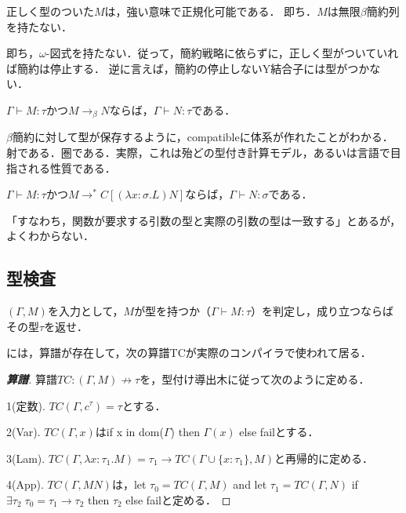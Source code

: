 \documentclass[uplatex, dvipdfmx]{jsreport}
\begin{document}
\begin{theorem}\label{thm-strong-normalizability}
    正しく型のついた$M$は，強い意味で正規化可能である．
    即ち．$M$は無限$\beta$簡約列を持たない．
\end{theorem}
\begin{remark}
    即ち，$\omega$-図式を持たない．従って，簡約戦略に依らずに，正しく型がついていれば簡約は停止する．
    逆に言えば，簡約の停止しないY結合子には型がつかない．
\end{remark}

\begin{theorem}\label{thm-subject-reduction-theorem}
    $\Gamma\vdash M:\tau$かつ$M\to_\beta N$ならば，$\Gamma\vdash N:\tau$である．
\end{theorem}
\begin{remark}
    $\beta$簡約に対して型が保存するように，compatibleに体系が作れたことがわかる．射である．圏である．実際，これは殆どの型付き計算モデル，あるいは言語で目指される性質である．
\end{remark}
\begin{corollary}
    $\Gamma\vdash M:\tau$かつ$M\to^* C[(\lambda x:\sigma.L)N]$ならば，$\Gamma\vdash N:\sigma$である．
\end{corollary}
\begin{remark}
    「すなわち，関数が要求する引数の型と実際の引数の型は一致する」とあるが，よくわからない．
\end{remark}

\subsection{型検査}
\begin{question*}
    $(\Gamma,M)$を入力として，$M$が型を持つか（$\Gamma\vdash M:\tau$）を判定し，成り立つならばその型$\tau$を返せ．
\end{question*}
には，算譜が存在して，次の算譜TCが実際のコンパイラで使われて居る．
\begin{proof}[\textbf{算譜}]
    算譜$TC:(\Gamma,M)\nrightarrow\tau$を，型付け導出木に従って次のように定める．

    1(定数). $TC(\Gamma,c^\tau)=\tau$とする．

    2(Var). $TC(\Gamma,x)$はif x in dom($\Gamma$) then $\Gamma(x)$ else failとする．

    3(Lam). $TC(\Gamma,\lambda x:\tau_1.M)=\tau_1\to TC(\Gamma\cup\{x:\tau_1\},M)$と再帰的に定める．

    4(App). $TC(\Gamma,MN)$は，let $\tau_0=TC(\Gamma,M)$ and let $\tau_1=TC(\Gamma,N)$ if $\exists\tau_2\;\tau_0=\tau_1\to\tau_2$ then $\tau_2$ else failと定める．
\end{proof}
\end{document}
